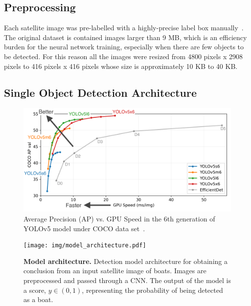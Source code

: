 \subsection{Preprocessing}
Each satellite image was pre-labelled with a highly-precise label box manually~\cite{lutherborrowship}. The original dataset is contained images larger than 9 MB, which is an efficiency burden for the neural network training, especially when there are few objects to be detected. For this reason all the images were resized from 4800 pixels x 2908 pixels to 416 pixels x 416 pixels whose size is approximately 10 KB to 40 KB. 


\subsection{Single Object Detection Architecture}
\label{III-D-Detection-Architecture}

\begin{figure}[t]
    \center
    \includegraphics[width=\columnwidth]{img/YOLOv5_Performance.png}
    \caption{{Average Precision (AP) vs. GPU Speed in the 6th generation of YOLOv5 model under COCO data set~\cite{glenn_jocher_2020_4154370}.}}
    \label{fig:YOLOv5_Performance}
\end{figure}

\begin{figure}[!t]
    \centering
    \texttt{[image: img/model\_architecture.pdf]}
    \caption{\textbf{Model architecture.} Detection model architecture for obtaining a conclusion from an input satellite image of boats.  Images are preprocessed and passed through a CNN. The output of the model is a score, $y \in (0,1)$, representing the probability of being detected as a boat.}
    \label{model_architecture}
\end{figure}


